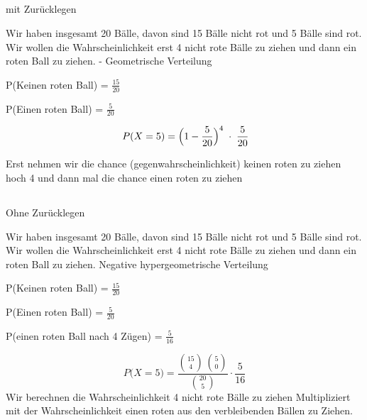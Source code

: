\subsection*{\centering{}}
\begin{center}
\normalsize
\textcolor{red}{\warning}\textcolor{red}{\warning} mit Zurücklegen \textcolor{red}{\warning}\textcolor{red}{\warning}
\end{center}
\normalsize

Wir haben insgesamt 20 Bälle, davon sind 15 Bälle nicht rot
und 5 Bälle sind rot. Wir wollen die Wahrscheinlichkeit erst 4
nicht rote Bälle zu ziehen und dann ein roten Ball zu ziehen. - Geometrische Verteilung
\begin{mdframed}[linecolor=yellow, linewidth=2pt]
P(Keinen roten Ball) = $\frac{15}{20}$

P(Einen roten Ball) = $\frac{5}{20}$
\end{mdframed}
\large{
\[\;P(X = 5)
= \Bigl(1 - \frac{5}{20}\Bigr)^{4}
\;\cdot\;\frac{5}{20}
\]}
\normalsize
{}
Erst nehmen wir die chance (gegenwahrscheinlichkeit) keinen roten zu ziehen hoch 4 und dann mal die chance einen roten zu ziehen

\subsection*{\centering{}}
\begin{center}
\normalsize
\textcolor{red}{\warning}\textcolor{red}{\warning} Ohne Zurücklegen \textcolor{red}{\warning}\textcolor{red}{\warning}
\end{center}
\normalsize
Wir haben insgesamt 20 Bälle, davon sind 15 Bälle nicht rot und 5 Bälle sind rot.
Wir wollen die Wahrscheinlichkeit erst 4 nicht rote Bälle zu ziehen und dann ein roten Ball zu ziehen. Negative hypergeometrische Verteilung
\begin{tcolorbox}[colback=white,colframe=yellow,sharp corners]
P(Keinen roten Ball) = $\frac{15}{20}$

P(Einen roten Ball) = $\frac{5}{20}$

P(einen roten Ball nach 4 Zügen) = $\frac{5}{16}$

\end{tcolorbox}
\[
P\bigl(X = 5\bigr)
= \frac{\binom{15}{4}\,\binom{5}{0}}{\binom{20}{5}} \cdot \frac{5}{16}
\]
\normalsize
Wir berechnen die Wahrscheinlichkeit 4 nicht rote Bälle zu ziehen Multipliziert mit der Wahrscheinlichkeit einen roten aus den verbleibenden Bällen zu Ziehen.
